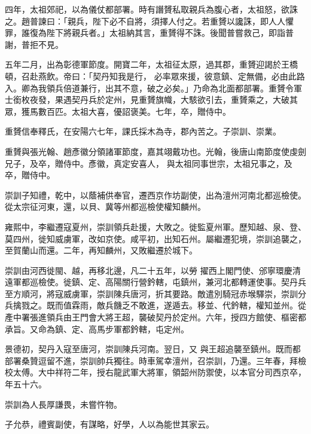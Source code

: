 \begin{pinyinscope}
 四年，太祖郊祀，以為儀仗都部署。時有譖贇私取親兵為腹心者，太祖怒，欲誅之。趙普諫曰：「親兵，陛下必不自將，須擇人付之。若重贇以讒誅，即人人懼罪，誰復為陛下將親兵者。」太祖納其言，重贇得不誅。後聞普嘗救己，即詣普謝，普拒不見。



 五年二月，出為彰德軍節度。開寶二年，太祖征太原，過其郡，重贇迎謁於王橋頓，召赴燕飲。帝曰：「契丹知我是行，
 必率眾來援，彼意鎮、定無備，必由此路入。卿為我領兵倍道兼行，出其不意，破之必矣。」乃命為北面都部署。重贇令軍士銜枚夜發，果遇契丹兵於定州，見重贇旗幟，大駭欲引去，重贇乘之，大破其眾，獲馬數百匹。太祖大喜，優詔褒美。七年，卒，贈侍中。



 重贇信奉釋氏，在安陽六七年，課氏採木為寺，郡內苦之。子崇訓、崇業。



 重贇與張光翰、趙彥徽分領諸軍節度，嘉其翊戴功也。光翰，後唐山南節度使虔劍兄子，及卒，贈侍中。彥徽，真定安喜人，
 與太祖同事世宗，太祖兄事之，及卒，贈侍中。



 崇訓子知禮，乾中，以蔭補供奉官，遷西京作坊副使，出為澶州河南北都巡檢使。從太宗征河東，還，以貝、冀等州都巡檢使權知麟州。



 雍熙中，李繼遷寇夏州，崇訓領兵赴援，大敗之。徙監夏州軍。歷知越、泉、登、莫四州，徙知威虜軍，改如京使。咸平初，出知石州。屬繼遷犯境，崇訓追襲之，至賀蘭山而還。二年，再知麟州，又敗繼遷於城下。



 崇訓由河西徙閩、越，再移北邊，凡二十五年，以勞
 擢西上閣門使、邠寧環慶清遠軍都巡檢使。徙鎮、定、高陽關行營鈐轄，屯鎮州，兼河北都轉運使事。契丹兵至方順河，將寇威虜軍，崇訓陳兵唐河，折其要路。敵遣別騎冠赤堠驛崇，崇訓分兵擒戮之。既而值霖雨，敵兵饑乏不敢進，遂遁去。移並、代鈐轄，權知並州。從產中署張進領兵由王門會大將王超，襲破契丹於定州。六年，授四方館使、樞密都承旨。又命為鎮、定、高馬步軍都鈐轄，屯定州。



 景德初，契丹入寇至唐河，崇訓陳兵河南。翌日，又
 與王超追襲至鎮州。既而都部署桑贊逗留不進，崇訓帥兵獨往。時車駕幸澶州，召崇訓，乃還。三年春，拜檢校太傅。大中祥符二年，授右龍武軍大將軍，領韶州防禦使，以本官分司西京卒，年五十六。



 崇訓為人長厚謙畏，未嘗忤物。



 子允恭，禮賓副使，有謀略，好學，人以為能世其家云。




\end{pinyinscope}
